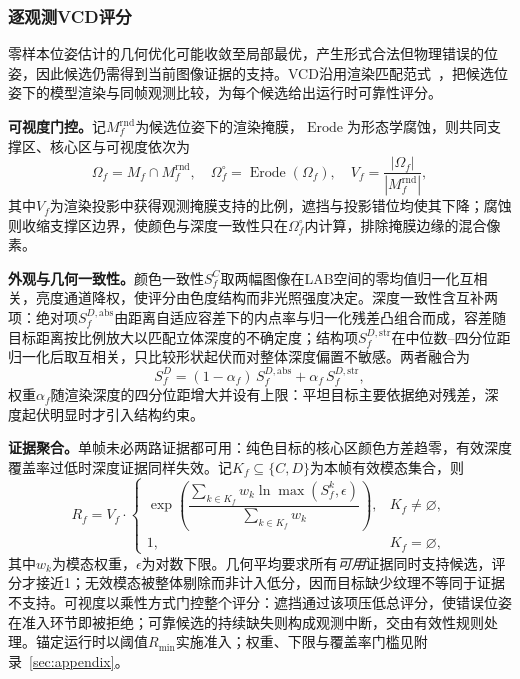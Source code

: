 \documentclass[review]{vgtc}
\begin{document}
\subsubsection{逐观测VCD评分}

零样本位姿估计的几何优化可能收敛至局部最优，产生形式合法但物理错误的位姿，因此候选仍需得到当前图像证据的支持。VCD沿用渲染匹配范式~\cite{cosypose2020,megapose2022}，把候选位姿下的模型渲染与同帧观测比较，为每个候选给出运行时可靠性评分。

\textbf{可视度门控。}记$M_f^{\mathrm{rnd}}$为候选位姿下的渲染掩膜，$\operatorname{Erode}$为形态学腐蚀，则共同支撑区、核心区与可视度依次为
\begin{equation}
\Omega_f = M_f \cap M_f^{\mathrm{rnd}}, \quad \Omega_f^{\circ} = \operatorname{Erode}(\Omega_f), \quad V_f = \frac{|\Omega_f|}{|M_f^{\mathrm{rnd}}|},
\label{eq:visibility}
\end{equation}
其中$V_f$为渲染投影中获得观测掩膜支持的比例，遮挡与投影错位均使其下降；腐蚀则收缩支撑区边界，使颜色与深度一致性只在$\Omega_f^{\circ}$内计算，排除掩膜边缘的混合像素。

\textbf{外观与几何一致性。}颜色一致性$S_f^C$取两幅图像在LAB空间的零均值归一化互相关，亮度通道降权，使评分由色度结构而非光照强度决定。深度一致性含互补两项：绝对项$S_f^{D,\mathrm{abs}}$由距离自适应容差下的内点率与归一化残差凸组合而成，容差随目标距离按比例放大以匹配立体深度的不确定度；结构项$S_f^{D,\mathrm{str}}$在中位数--四分位距归一化后取互相关，只比较形状起伏而对整体深度偏置不敏感。两者融合为
\begin{equation}
S_f^D = (1-\alpha_f)\,S_f^{D,\mathrm{abs}} + \alpha_f\,S_f^{D,\mathrm{str}},
\label{eq:depth-score}
\end{equation}
权重$\alpha_f$随渲染深度的四分位距增大并设有上限：平坦目标主要依据绝对残差，深度起伏明显时才引入结构约束。

\textbf{证据聚合。}单帧未必两路证据都可用：纯色目标的核心区颜色方差趋零，有效深度覆盖率过低时深度证据同样失效。记$K_f \subseteq \{C, D\}$为本帧有效模态集合，则
\begin{equation}
R_f = V_f \cdot
\begin{cases}
\exp\!\left(\dfrac{\sum_{k \in K_f} w_k \ln \max(S_f^{k}, \epsilon)}{\sum_{k \in K_f} w_k}\right), & K_f \neq \varnothing, \\[6pt]
1, & K_f = \varnothing,
\end{cases}
\label{eq:vcd}
\end{equation}
其中$w_k$为模态权重，$\epsilon$为对数下限。几何平均要求所有\emph{可用}证据同时支持候选，评分才接近1；无效模态被整体剔除而非计入低分，因而目标缺少纹理不等同于证据不支持。可视度以乘性方式门控整个评分：遮挡通过该项压低总评分，使错误位姿在准入环节即被拒绝；可靠候选的持续缺失则构成观测中断，交由有效性规则处理。锚定运行时以阈值$R_{\min}$实施准入；权重、下限与覆盖率门槛见附录~\ref{sec:appendix}。
\end{document}
